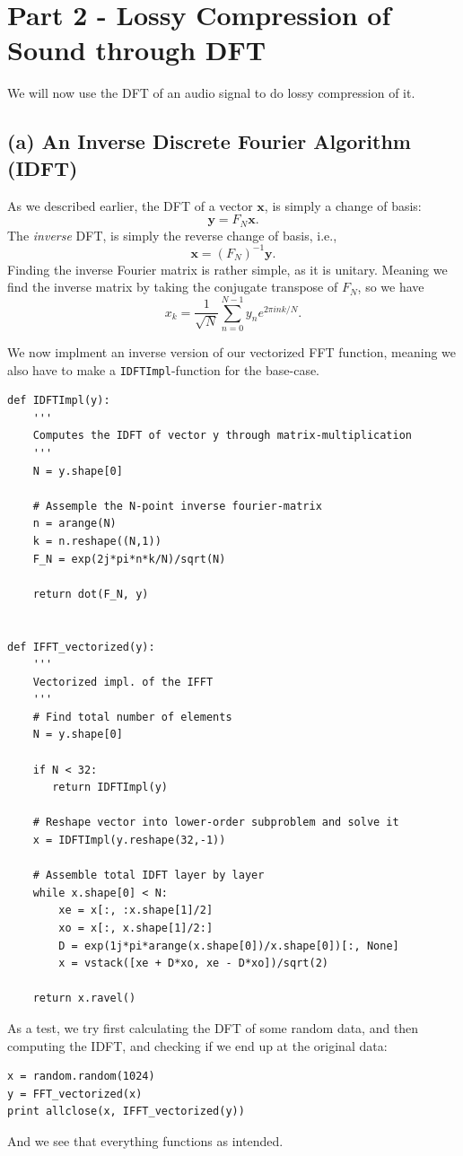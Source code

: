 \documentclass[a4paper, 11pt, notitlepage, english]{article}
\newcommand{\bt}[1]{\boldsymbol{#1}}
\begin{document}
\clearpage

\section*{Part 2 - Lossy Compression of Sound through DFT}
We will now use the DFT of an audio signal to do lossy compression of it. 

\subsection*{(a) An Inverse Discrete Fourier Algorithm (IDFT)}
As we described earlier, the DFT of a vector $\bt{x}$, is simply a change of basis:
$$\bt{y} = F_N \bt{x}.$$
The \emph{inverse} DFT, is simply the reverse change of basis, i.e.,
$$\bt{x} = (F_N)^{-1} \bt{y}.$$
Finding the inverse Fourier matrix is rather simple, as it is unitary. Meaning we find the inverse matrix by taking the conjugate transpose of $F_N$, so we have
$$x_k = \frac{1}{\sqrt{N}}\sum_{n=0}^{N-1}y_n e^{2\pi i n k/N}.$$

We now implment an inverse version of our vectorized FFT function, meaning we also have to make a \verb+IDFTImpl+-function for the base-case.
\begin{lstlisting}
def IDFTImpl(y):
    '''
    Computes the IDFT of vector y through matrix-multiplication
    '''
    N = y.shape[0]

    # Assemple the N-point inverse fourier-matrix
    n = arange(N)
    k = n.reshape((N,1))
    F_N = exp(2j*pi*n*k/N)/sqrt(N)

    return dot(F_N, y)


def IFFT_vectorized(y):
    '''
    Vectorized impl. of the IFFT
    '''
    # Find total number of elements
    N = y.shape[0]

    if N < 32:
       return IDFTImpl(y)

    # Reshape vector into lower-order subproblem and solve it
    x = IDFTImpl(y.reshape(32,-1))

    # Assemble total IDFT layer by layer
    while x.shape[0] < N:
        xe = x[:, :x.shape[1]/2]
        xo = x[:, x.shape[1]/2:]
        D = exp(1j*pi*arange(x.shape[0])/x.shape[0])[:, None]
        x = vstack([xe + D*xo, xe - D*xo])/sqrt(2)

    return x.ravel()
\end{lstlisting}

\clearpage

As a test, we try first calculating the DFT of some random data, and then computing the IDFT, and checking if we end up at the original data:
\begin{lstlisting}
x = random.random(1024)
y = FFT_vectorized(x)
print allclose(x, IFFT_vectorized(y))    
\end{lstlisting}
\vspace{-0.3cm}
And we see that everything functions as intended.
\end{document}
